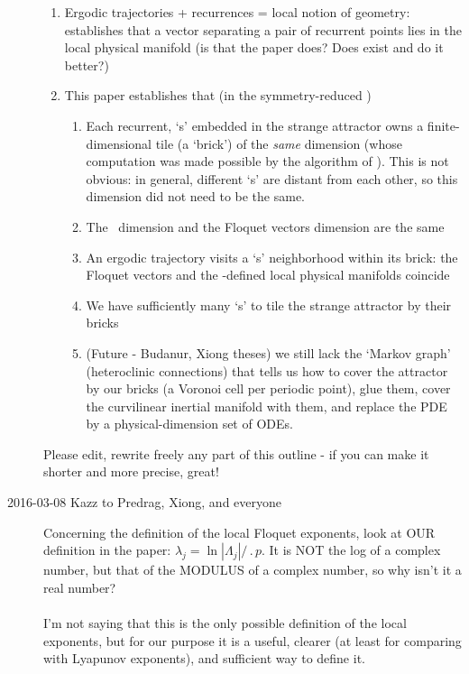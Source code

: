 \begin{description}
{\begin{enumerate}
  \item
  Ergodic trajectories + recurrences = local notion of geometry:
   establishes that a vector separating a pair of
  recurrent points lies in the local physical manifold (is that the paper
  does? Does  exist and do it better?)
  \item This paper establishes that (in the symmetry-reduced \statesp)
    \begin{enumerate}
      \item Each recurrent, `\po s' embedded in the strange attractor
      owns a finite-dimensional tile (a `brick') of the \emph{same}
      dimension (whose computation was made possible by the algorithm of
      ). This is not obvious: in general, different
      `\po s' are distant from each other, so this dimension did not need
      to be the same.
      \item The \cLvs\ dimension and the Floquet vectors dimension are the same
      \item An ergodic trajectory visits a `\po s' neighborhood within its
      brick: the Floquet vectors and the  \cLvs-defined local
      physical manifolds coincide
      \item We have sufficiently many `\po s' to tile the strange attractor
      by their bricks
      \item (Future - Budanur, Xiong theses) we still lack the `Markov
      graph' (heteroclinic connections) that tells us how to cover the
      attractor by our bricks (a Voronoi cell per periodic point), glue
      them, cover the curvilinear inertial manifold with them, and
      replace the PDE by a physical-dimension set of ODEs.
    \end{enumerate}
\end{enumerate}
Please edit, rewrite freely any part of this outline - if you can make it
shorter and more precise, great!
    }

\item[2016-03-08 Kazz to Predrag, Xiong, and everyone]
Concerning the definition of the local Floquet exponents, look at OUR
definition in the paper: $\lambda_j=\ln|\Lambda_j|/\period{p}$. It is NOT
the log of a complex number, but that of the MODULUS of a complex number,
so why isn't it a real number?
\\
\\
I'm not saying that this is the only
possible definition of the local exponents, but for our purpose it is a
useful, clearer (at least for comparing with Lyapunov exponents), and
sufficient way to define it.


\end{description}
